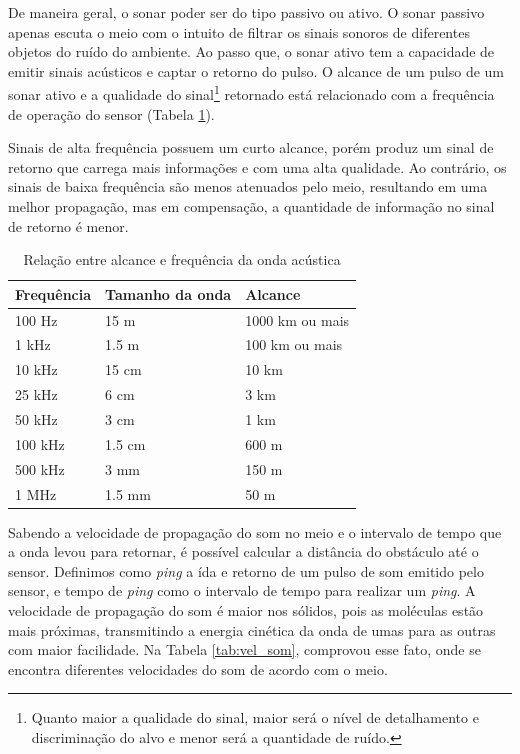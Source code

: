 De maneira geral, o sonar poder ser do tipo passivo ou ativo. O sonar passivo apenas escuta o meio com o intuito de filtrar os sinais sonoros de diferentes objetos do ruído do ambiente. Ao passo que, o sonar ativo tem a capacidade de emitir sinais acústicos e captar o retorno do pulso. O alcance de um pulso de um sonar ativo e a qualidade do sinal\footnote{Quanto maior a qualidade do sinal, maior será o nível de detalhamento e discriminação do alvo e menor será a quantidade de ruído.} retornado está relacionado com a frequência de operação do sensor (Tabela \ref{tab:freq-acustica}).

Sinais de alta frequência possuem um curto alcance, porém produz um sinal de retorno que carrega mais informações e com uma alta qualidade. Ao contrário, os sinais de baixa frequência são menos atenuados pelo meio, resultando em uma melhor propagação, mas em compensação, a quantidade de informação no sinal de retorno é menor.

\begin{table}[H]
    \centering
    \caption{Relação entre alcance e frequência da onda acústica}
    \label{tab:freq-acustica}
    \begin{tabular}{@{}lll@{}}
    \toprule
        Frequência & Tamanho da onda & Alcance \\ \midrule
        100 Hz & 15 m & 1000 km ou mais \\
        1 kHz & 1.5 m & 100 km ou mais \\
        10 kHz & 15 cm & 10 km \\
        25 kHz & 6 cm & 3 km \\
        50 kHz & 3 cm & 1 km \\
        100 kHz & 1.5 cm & 600 m \\
        500 kHz & 3 mm & 150 m \\
        1 MHz & 1.5 mm & 50 m \\ \bottomrule
    \end{tabular}
\end{table}

Sabendo a velocidade de propagação do som no meio e o intervalo de tempo que a onda levou para retornar, é possível calcular a distância do obstáculo até o sensor. 
Definimos como \textit{ping} a ída e retorno de um pulso de som emitido pelo sensor, e tempo de \textit{ping} como o intervalo de tempo para realizar um \textit{ping}. 
A velocidade de propagação do som é maior nos sólidos, pois as moléculas estão mais próximas, transmitindo a energia cinética da onda de umas para as outras com maior facilidade. 
Na Tabela \ref{tab:vel_som}, \cite{halliday2008fundamentals} comprovou esse fato, onde se encontra diferentes velocidades do som de acordo com o meio.

